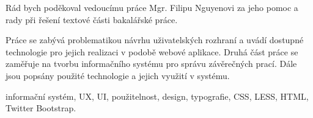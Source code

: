\documentclass[11pt,oneside]{fithesis2}
\begin{document}
\FrontMatter
\ThesisTitlePage

\begin{ThesisDeclaration}
    \DeclarationText
    \AdvisorName
\end{ThesisDeclaration}

\begin{ThesisThanks}
    Rád bych poděkoval vedoucímu práce Mgr. Filipu Nguyenovi za jeho pomoc a rady při řešení textové části bakalářské práce.
\end{ThesisThanks}

\begin{ThesisAbstract}
    Práce se zabývá problematikou návrhu uživatelských rozhraní a uvádí dostupné technologie pro jejich realizaci v podobě webové aplikace. Druhá část práce se zaměřuje na tvorbu informačního systému pro správu závěrečných prací. Dále jsou popsány použité technologie a jejich využití v systému.
\end{ThesisAbstract}

\begin{ThesisKeyWords}
    informační systém, UX, UI, použitelnost, design, typografie, CSS, LESS, HTML, Twitter Bootstrap.
\end{ThesisKeyWords}

\MainMatter

\tableofcontents











\appendix


\end{document}
